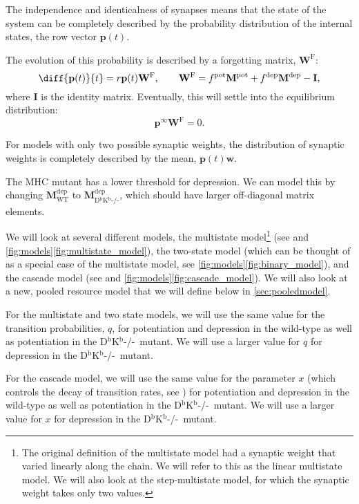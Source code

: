 \documentclass[12pt]{article}
\newcommand{\I}{\mathbf{I}}
\newcommand{\pr}{\mathbf{p}}
\newcommand{\eq}{\pr^\infty}
\newcommand{\w}{\mathbf{w}}
\newcommand{\W}{\mathbf{W}}
\newcommand{\frg}{\W^\mathrm{F}}
\newcommand{\M}{\mathbf{M}}
\newcommand{\pot}{^{\text{pot}}}
\newcommand{\dep}{^{\text{dep}}}
\newcommand{\wt}{_{\text{WT}}}
\newcommand{\ko}{_{\text{D$^\mathrm{b}$K$^\mathrm{b}$-/-}}}
\newcommand{\KO}{D$^\mathrm{b}$K$^\mathrm{b}$-/-}
\begin{document}
The independence and identicalness of synapses means that the state of the system can be completely described by the probability distribution of the internal states, the row vector $\pr(t)$.

The evolution of this probability is described by a forgetting matrix, $\frg$:
%
\begin{equation}\label{eq:evolve}
  \diff{\pr(t)}{t} = r\pr(t)\frg,
  \qquad
  \frg = f\pot\M\pot+f\dep\M\dep-\I,
\end{equation}
where $\I$ is the identity matrix.
%
Eventually, this will settle into the equilibrium distribution:
%
\begin{equation}\label{eq:eqprob}
  \eq\frg=0.
\end{equation}
%

For models with only two possible synaptic weights, the distribution of synaptic weights is completely described by the mean, $\pr(t)\w$.


The MHC mutant has a lower threshold for depression.
We can model this by changing $\M\dep\wt$ to $\M\dep\ko$, which should have larger off-diagonal matrix elements.

We will look at several different models,
the multistate model\footnote{The original definition of the multistate model had a synaptic weight that varied linearly along the chain. We will refer to this as the linear multistate model. We will also look at the step-multistate model, for which the synaptic weight takes only two values.} (see \cite{amit1994learning,Fusi2007multistate} and \autoref{fig:models}\ref{fig:multistate_model}),
the two-state model (which can be thought of as a special case of the multistate model, see \autoref{fig:models}\ref{fig:binary_model}),
and the cascade model (see \cite{Fusi2005cascade} and \autoref{fig:models}\ref{fig:cascade_model}).
We will also look at a new, pooled resource model that we will define below in \autoref{sec:pooledmodel}.

For the multistate and two state models, we will use the same value for the transition probabilities, $q$, for potentiation and depression in the wild-type as well as potentiation in the \KO\ mutant.
We will use a larger value for $q$ for depression in the \KO\ mutant.

For the cascade model, we will use the same value for the parameter $x$ (which controls the decay of transition rates, see \cite{Fusi2005cascade}) for potentiation and depression in the wild-type as well as potentiation in the \KO\ mutant.
We will use a larger value for $x$ for depression in the \KO\ mutant.
\end{document}
